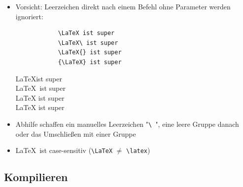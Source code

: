 \begin{frame}[<+->][fragile]
	\lstset{frame=none, numbers=none, xleftmargin=0cm}
	\begin{itemize}
		\item Vorsicht: Leerzeichen direkt nach einem Befehl ohne Parameter werden ignoriert:

		\begin{minipage}[c]{0.45\textwidth}
			\begin{lstlisting}
			\LaTeX ist super
			\LaTeX\ ist super
			\LaTeX{} ist super
			{\LaTeX} ist super
			\end{lstlisting}
		\end{minipage}
		\begin{minipage}[c]{0.45\textwidth}
			\justifying\rmfamily
			\LaTeX ist super\\
			\LaTeX\ ist super\\
			\LaTeX{} ist super\\
			{\LaTeX} ist super
		\end{minipage}
		\item Abhilfe schaffen ein manuelles Leerzeichen "\lstinline!\ !", eine leere Gruppe danach oder das Umschließen mit einer Gruppe
		\item \LaTeX\ ist case-sensitiv (\lstinline|\LaTeX| $\ne$ \lstinline|\latex|)
	\end{itemize}
\end{frame}

\subsection{Kompilieren}

